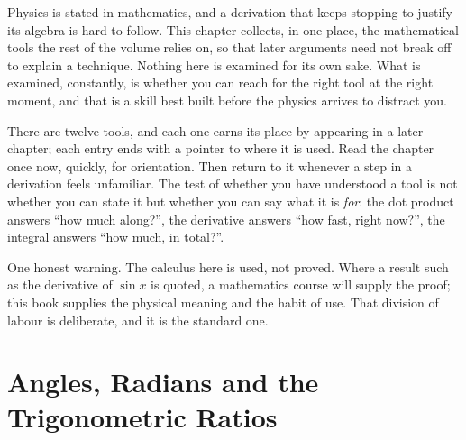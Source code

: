 
\label{ch:toolkit}

Physics is stated in mathematics, and a derivation that keeps stopping to justify its algebra is
hard to follow. This chapter collects, in one place, the mathematical tools the rest of the volume
relies on, so that later arguments need not break off to explain a technique. Nothing here is examined
for its own sake. What is examined, constantly, is whether you can reach for the right tool at the
right moment, and that is a skill best built before the physics arrives to distract you.

There are twelve tools, and each one earns its place by appearing in a later chapter; each entry ends
with a pointer to where it is used. Read the chapter once now, quickly, for orientation. Then return
to it whenever a step in a derivation feels unfamiliar. The test of whether you have understood a
tool is not whether you can state it but whether you can say what it is \emph{for}: the dot product
answers ``how much along?'', the derivative answers ``how fast, right now?'', the integral answers
``how much, in total?''.

One honest warning. The calculus here is used, not proved. Where a result such as the derivative of
$\sin x$ is quoted, a mathematics course will supply the proof; this book supplies the physical
meaning and the habit of use. That division of labour is deliberate, and it is the standard one.

\section{Angles, Radians and the Trigonometric Ratios}

